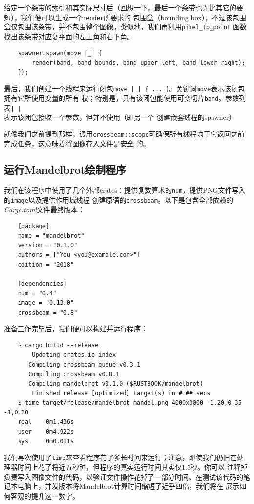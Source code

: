 \smallskip
给定一个条带的索引和其实际尺寸后（回想一下，最后一个条带也许比其它的要短），我们便可以生成一个\texttt{render}所要求的
包围盒（bounding box），不过该包围盒仅包围该条带，并不包围整个图像。类似地，我们再利用\texttt{pixel\_to\_point}
函数找出该条带对应复平面的左上角和右下角。
\begin{verbatim}
    spawner.spawn(move |_| {
        render(band, band_bounds, band_upper_left, band_lower_right);
    });
\end{verbatim}

\smallskip
最后，我们创建一个线程来运行闭包\texttt{move |\_| \{ ... \}}。关键词\texttt{move}表示该闭包拥有它所使用变量的所有
权；特别是，只有该闭包能使用可变切片\texttt{band}。参数列表\texttt{|\_|}表示该闭包接收一个参数，但并不使用（即另一个
创建嵌套线程的spawner）

\medskip
就像我们之前提到那样，调用\texttt{crossbeam::scope}可确保所有线程均于它返回之前完成任务，这意味着将图像存入文件是安全
的。

\medskip
\subsection{运行Mandelbrot绘制程序}
我们在该程序中使用了几个外部crates：提供复数算术的\texttt{num}，提供PNG文件写入的\texttt{image}以及提供作用域线程
创建原语的\texttt{crossbeam}。以下是包含全部依赖的\textit{Cargo.toml}文件最终版本：
\begin{verbatim}
    [package]
    name = "mandelbrot"
    version = "0.1.0"
    authors = ["You <you@example.com>"]
    edition = "2018"

    [dependencies]
    num = "0.4"
    image = "0.13.0"
    crossbeam = "0.8"
\end{verbatim}

\smallskip
准备工作完毕后，我们便可以构建并运行程序：
\begin{verbatim}
    $ cargo build --release
        Updating crates.io index
       Compiling crossbeam-queue v0.3.1
       Compiling crossbeam v0.8.1
       Compiling mandelbrot v0.1.0 ($RUSTBOOK/mandelbrot)
        Finished release [optimized] target(s) in #.## secs
    $ time target/release/mandelbrot mandel.png 4000x3000 -1.20,0.35 -1,0.20
    real    0m1.436s
    user    0m4.922s
    sys     0m0.011s
\end{verbatim}

\smallskip
我们再次使用了\texttt{time}来查看程序花了多长时间来运行；注意，即使我们仍旧在处理器时间上花了将近五秒钟，但程序的真实运行时间其实仅1.5秒。你可以
注释掉负责写入图像文件的代码，以验证文件操作花掉了一部分时间。在测试该代码的笔记本电脑上，并发版本将Mandelbrot计算时间缩短了近乎四倍。我们将在
展示如何客观的提升这一数字。

